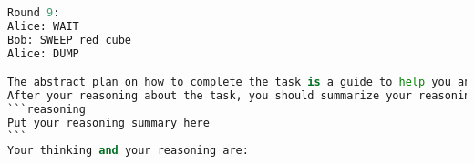 \begin{lstlisting}[language=Python]
Round 9:
Alice: WAIT
Bob: SWEEP red_cube
Alice: DUMP

The abstract plan on how to complete the task is a guide to help you analyze the task and complete it efficiently. Based on the action history and the observation of the env, think about which subtask the robots are processing currently. To complete the task efficiently, you are encouraged to reason what actions to do in the current step and several future steps. You are supposed to imagine env state after each step to help you make decision on next step, thus forms a step-by-step reasoning form. (Specifically, how futher you need to plan depends on your confidence, but you are encounraged to reason futher). Remember in each step, each robot can only take one action!!!
After your reasoning about the task, you should summarize your reasoning and output the summary result like
```reasoning
Put your reasoning summary here
```
Your thinking and your reasoning are:
    
\end{lstlisting}
